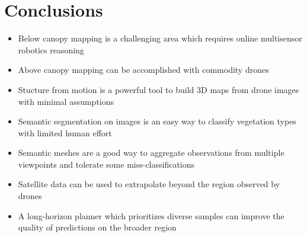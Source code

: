 
\chapter{Conclusions} \label{chapConclusions}

\begin{itemize}
    \item Below canopy mapping is a challenging area which requires online multisensor robotics reasoning
    \item Above canopy mapping can be accomplished with commodity drones 
    \item Stucture from motion is a powerful tool to build 3D maps from drone images with minimal assumptions
    \item Semantic segmentation on images is an easy way to classify vegetation types with limited human effort
    \item Semantic meshes are a good way to aggregate observations from multiple viewpoints and tolerate some miss-classifications
    \item Satellite data can be used to extrapolate beyond the region observed by drones
    \item A long-horizon planner which prioritizes diverse samples can improve the quality of predictions on the broader region
\end{itemize}